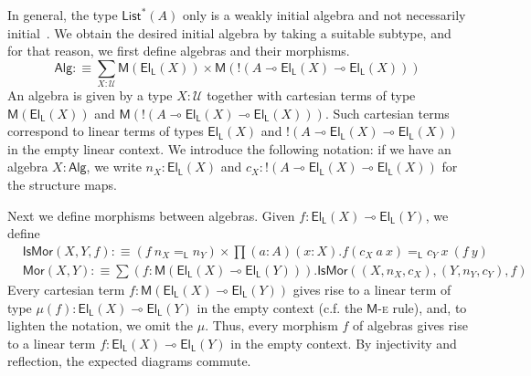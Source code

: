 \documentclass[a4paper,UKenglish,cleveref,numberwithinsect, autoref, thm-restate]{lipics-v2021}
\newcommand{\lin}{\multimap}
\newcommand{\Univ}{\mathcal{U}}
\newcommand{\El}{\mathsf{El}}
\newcommand{\ElL}[1]{\El_{\mathsf{L}}\left(#1\right)}
\newcommand{\expL}[1]{\mathbin{!} #1}
\newcommand{\ListI}[1]{\mathsf{List}^*(#1)}
\newcommand{\Alg}{\mathsf{Alg}}
\newcommand{\IsMor}[3]{\mathsf{IsMor}(#1, #2, #3)}
\newcommand{\Mor}[2]{\mathsf{Mor}(#1, #2)}
\newcommand{\defeq}{\mathrel{:\equiv}}
\newcommand{\lineq}[2]{#1 =_\mathsf{L} #2}
\newcommand{\m}{\mathsf{M}}
\begin{document}
In general, the type $\ListI{A}$ only is a weakly initial algebra
and not necessarily initial~\cite{geuvers:2001,rummelhoff:2004}.
We obtain the desired initial algebra by taking a suitable subtype,
and for that reason,
we first define algebras and their morphisms.
\[
\Alg
\defeq
\sum_{X : \Univ} \m(\ElL{X}) \times \m(\expL{(A \lin \ElL{X} \lin \ElL{X})})
\]
An algebra is given by a type $X : \Univ$
together with cartesian terms of type $\m(\ElL{X})$ and $\m(\expL{(A \lin \ElL{X} \lin \ElL{X})})$.
Such cartesian terms correspond to linear terms of types $\ElL{X}$ and $\expL{(A \lin \ElL{X} \lin \ElL{X})}$ in the empty linear context.
We introduce the following notation:
if we have an algebra $X : \Alg$,
we write $n_X : \ElL{X}$
and $c_X : \expL{(A \lin \ElL{X} \lin \ElL{X})}$
for the structure maps.


Next we define morphisms between algebras.
Given  $f : \ElL{X} \lin \ElL{Y}$,
we define
\begin{align*}
&\IsMor{X}{Y}{f}
\defeq
(\lineq{f \> n_X}{n_Y})
\times
\prod (a : A) (x : X) . \lineq{f(c_X \> a \> x)}{c_Y \> x \> (f \> y)}
\\
&\Mor{X}{Y}
\defeq
\sum (f : \m(\ElL{X} \lin \ElL{Y})) . \IsMor{(X, n_X, c_X)}{(Y, n_Y, c_Y)}{f}
\end{align*}
Every cartesian term $f : \m(\ElL{X} \lin \ElL{Y})$ gives rise to a linear term of type $\mu(f) : \ElL{X} \lin \ElL{Y}$ in the empty context (c.f. the $\m$-\textsc{e} rule),
and, to lighten the notation,
we omit the $\mu$.
Thus,
every morphism $f$ of algebras gives rise to a linear term $f : \ElL{X} \lin \ElL{Y}$ in the empty context.
By injectivity and reflection,
the expected diagrams commute.

\end{document}
